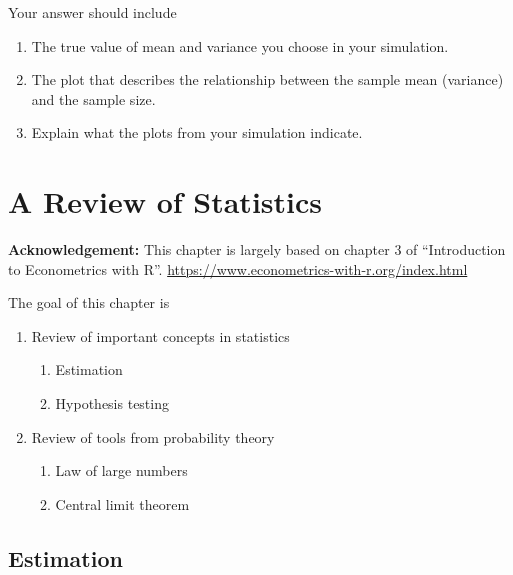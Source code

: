 \documentclass[]{book}
\providecommand{\tightlist}{%
  \setlength{\itemsep}{0pt}\setlength{\parskip}{0pt}}
\begin{document}
Your answer should include

\begin{enumerate}
\def\labelenumi{\arabic{enumi}.}
\tightlist
\item
  The true value of mean and variance you choose in your simulation.
\item
  The plot that describes the relationship between the sample mean
  (variance) and the sample size.
\item
  Explain what the plots from your simulation indicate.
\end{enumerate}

\chapter{A Review of Statistics}\label{a-review-of-statistics}

\textbf{Acknowledgement:} This chapter is largely based on chapter 3 of
``Introduction to Econometrics with R''.
\url{https://www.econometrics-with-r.org/index.html}

The goal of this chapter is

\begin{enumerate}
\def\labelenumi{\arabic{enumi}.}
\tightlist
\item
  Review of important concepts in statistics

  \begin{enumerate}
  \def\labelenumii{\arabic{enumii}.}
  \tightlist
  \item
    Estimation
  \item
    Hypothesis testing
  \end{enumerate}
\item
  Review of tools from probability theory

  \begin{enumerate}
  \def\labelenumii{\arabic{enumii}.}
  \tightlist
  \item
    Law of large numbers
  \item
    Central limit theorem
  \end{enumerate}
\end{enumerate}

\section{Estimation}\label{estimation}
\end{document}
